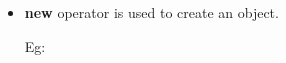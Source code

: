 
\begin{flushleft}
	
	\begin{itemize}
		\item \textbf{new} operator is used to create an object.
		
		\bigskip
		
		Eg:
		
	\end{itemize}
	
\end{flushleft}
